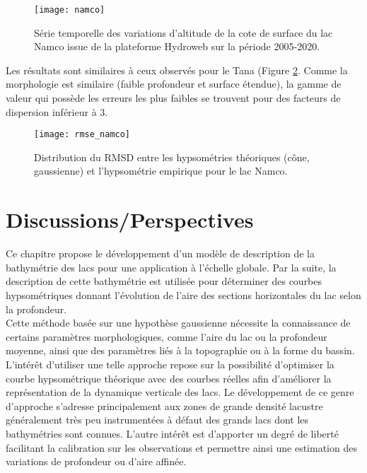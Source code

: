 \begin{figure}[h!]
\texttt{[image: namco]}
\caption{Série temporelle des variations d'altitude de la cote de surface du lac Namco issue de la plateforme Hydroweb sur la période 2005-2020.}
\label{namco}
\end{figure}

\noindent Les résultats sont similaires à ceux observés pour le Tana (Figure \ref{rmse_namco}. Comme la morphologie est similaire (faible profondeur et surface étendue), la gamme de valeur qui possède les erreurs les plus faibles se trouvent pour des facteurs de dispersion inférieur à 3.\\


\begin{figure}[h!]
\texttt{[image: rmse\_namco]}
\caption{Distribution du RMSD entre les hypsométries théoriques (cône, gaussienne) et l'hypsométrie empirique pour le lac Namco.}
\label{rmse_namco}
\end{figure}


\section{{\selectfont Discussions/Perspectives}}

Ce chapitre propose le développement d'un modèle de description de la bathymétrie des lacs pour une application à l'échelle globale. Par la suite, la description de cette bathymétrie est utilisée pour déterminer des courbes hypsométriques donnant l'évolution de l'aire des sections horizontales du lac selon la profondeur.\\ 
Cette méthode basée sur une hypothèse gaussienne nécessite la connaissance de certains paramètres morphologiques, comme l'aire du lac ou la profondeur moyenne, ainsi que des paramètres liés à la topographie ou à la forme du bassin.\\
L'intérêt d'utiliser une telle approche repose sur la possibilité d'optimiser la courbe hypsométrique théorique avec des courbes réelles afin d'améliorer la représentation de la dynamique verticale des lacs. Le développement de ce genre d'approche s'adresse principalement aux zones de grande densité lacustre généralement très peu instrumentées à défaut des grands lacs dont les bathymétries sont connues. L'autre intérêt est d'apporter un degré de liberté facilitant la calibration sur les observations et permettre ainsi une estimation des variations de profondeur ou d'aire affinée.\\

